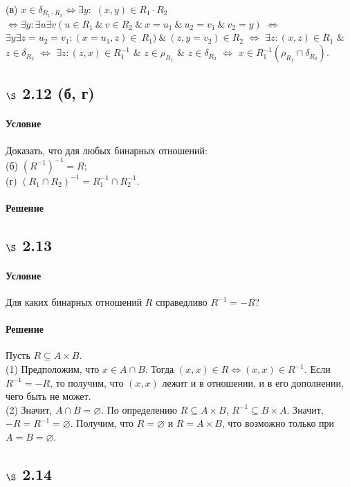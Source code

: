 \documentclass[a4paper,12pt]{article}
\begin{document}
\bigskip

(в) $x\in \delta_{R_1\cdot R_2} \Leftrightarrow \exists y:$ $(x,y)\in R_1\cdot R_2$
 $\Leftrightarrow \exists y: \exists u \exists v (u\in R_1 \ \& \ v\in R_2 \ \& \ x=u_1 \ \& \ u_2 = v_1 \ \& \ v_2 = y)$ $\Leftrightarrow$ $\exists y \exists z=u_2=v_1: (x=u_1,z)\in~R_1) \ \& \ (z,y=v_2)\in R_2$ $\Leftrightarrow$ $\exists z: (x,z)\in R_1$ $\&$ $z\in \delta_{R_2}$ $\Leftrightarrow$ $\exists z: (z,x)\in R_1^{-1}$ $\&$ $z\in \rho_{R_1}$ $\&$ $z\in \delta_{R_2}$ $\Leftrightarrow$ $x\in R_1^{-1} (\rho_{R_1} \cap \delta_{R_2})$.
\subsection*{$\S$ 2.12 (б, г)}
\paragraph*{Условие}
Доказать, что для любых бинарных отношений:\\
(б) $(R^{-1})^{-1} = R$; \\
(г) $(R_1 \cap R_2)^{-1} = R_1^{-1} \cap R_2^{-1}$.
\paragraph*{Решение}
\subsection*{$\S$ 2.13}
\paragraph*{Условие}
Для каких бинарных отношений $R$ справедливо $R^{-1} = -R$? 
\paragraph*{Решение}
Пусть $R \subseteq A\times B$. \\
(1) Предположим, что $x\in A \cap B$. Тогда $(x,x) \in R \Leftrightarrow (x,x) \in R^{-1}$. Если $R^{-1} = -R$, то получим, что $(x,x)$ лежит и в отношении, и в его дополнении, чего быть не может.\\
(2) Значит, $A \cap B=\varnothing$. По определению $R \subseteq A\times B$, $R^{-1} \subseteq B\times A$. Значит, $-R=R^{-1}=\varnothing$. Получим, что $R=\varnothing$ и $R=A\times B$, что возможно только при $A=B=\varnothing$. 
\subsection*{$\S$ 2.14}
\end{document}
